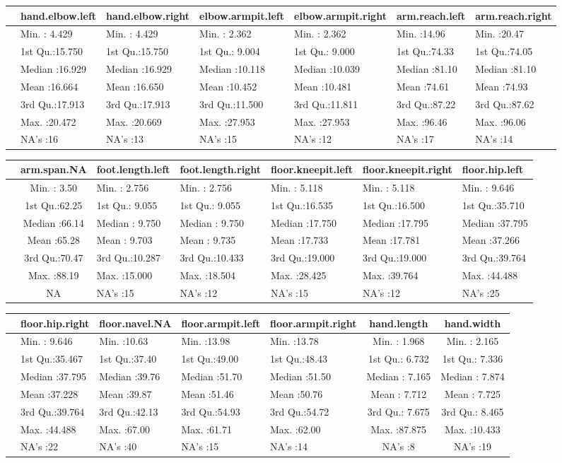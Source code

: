 \documentclass[]{article}
\begin{document}
\begin{longtable}[]{@{}lllllll@{}}
\toprule
& hand.elbow.left & hand.elbow.right & elbow.armpit.left &
elbow.armpit.right & arm.reach.left & arm.reach.right\tabularnewline
\midrule
\endhead
& Min. : 4.429 & Min. : 4.429 & Min. : 2.362 & Min. : 2.362 & Min.
:14.96 & Min. :20.47\tabularnewline
& 1st Qu.:15.750 & 1st Qu.:15.750 & 1st Qu.: 9.004 & 1st Qu.: 9.000 &
1st Qu.:74.33 & 1st Qu.:74.05\tabularnewline
& Median :16.929 & Median :16.929 & Median :10.118 & Median :10.039 &
Median :81.10 & Median :81.10\tabularnewline
& Mean :16.664 & Mean :16.650 & Mean :10.452 & Mean :10.481 & Mean
:74.61 & Mean :74.93\tabularnewline
& 3rd Qu.:17.913 & 3rd Qu.:17.913 & 3rd Qu.:11.500 & 3rd Qu.:11.811 &
3rd Qu.:87.22 & 3rd Qu.:87.62\tabularnewline
& Max. :20.472 & Max. :20.669 & Max. :27.953 & Max. :27.953 & Max.
:96.46 & Max. :96.06\tabularnewline
& NA's :16 & NA's :13 & NA's :15 & NA's :12 & NA's :17 & NA's
:14\tabularnewline
\bottomrule
\end{longtable}

\begin{longtable}[]{@{}lclllll@{}}
\toprule
& arm.span.NA & foot.length.left & foot.length.right &
floor.kneepit.left & floor.kneepit.right & floor.hip.left\tabularnewline
\midrule
\endhead
& Min. : 3.50 & Min. : 2.756 & Min. : 2.756 & Min. : 5.118 & Min. :
5.118 & Min. : 9.646\tabularnewline
& 1st Qu.:62.25 & 1st Qu.: 9.055 & 1st Qu.: 9.055 & 1st Qu.:16.535 & 1st
Qu.:16.500 & 1st Qu.:35.710\tabularnewline
& Median :66.14 & Median : 9.750 & Median : 9.750 & Median :17.750 &
Median :17.795 & Median :37.795\tabularnewline
& Mean :65.28 & Mean : 9.703 & Mean : 9.735 & Mean :17.733 & Mean
:17.781 & Mean :37.266\tabularnewline
& 3rd Qu.:70.47 & 3rd Qu.:10.287 & 3rd Qu.:10.433 & 3rd Qu.:19.000 & 3rd
Qu.:19.000 & 3rd Qu.:39.764\tabularnewline
& Max. :88.19 & Max. :15.000 & Max. :18.504 & Max. :28.425 & Max.
:39.764 & Max. :44.488\tabularnewline
& NA & NA's :15 & NA's :12 & NA's :15 & NA's :12 & NA's
:25\tabularnewline
\bottomrule
\end{longtable}

\begin{longtable}[]{@{}lllllcc@{}}
\toprule
& floor.hip.right & floor.navel.NA & floor.armpit.left &
floor.armpit.right & hand.length & hand.width\tabularnewline
\midrule
\endhead
& Min. : 9.646 & Min. :10.63 & Min. :13.98 & Min. :13.78 & Min. : 1.968
& Min. : 2.165\tabularnewline
& 1st Qu.:35.467 & 1st Qu.:37.40 & 1st Qu.:49.00 & 1st Qu.:48.43 & 1st
Qu.: 6.732 & 1st Qu.: 7.336\tabularnewline
& Median :37.795 & Median :39.76 & Median :51.70 & Median :51.50 &
Median : 7.165 & Median : 7.874\tabularnewline
& Mean :37.228 & Mean :39.87 & Mean :51.46 & Mean :50.76 & Mean : 7.712
& Mean : 7.725\tabularnewline
& 3rd Qu.:39.764 & 3rd Qu.:42.13 & 3rd Qu.:54.93 & 3rd Qu.:54.72 & 3rd
Qu.: 7.675 & 3rd Qu.: 8.465\tabularnewline
& Max. :44.488 & Max. :67.00 & Max. :61.71 & Max. :62.00 & Max. :87.875
& Max. :10.433\tabularnewline
& NA's :22 & NA's :40 & NA's :15 & NA's :14 & NA's :8 & NA's
:19\tabularnewline
\bottomrule
\end{longtable}
\end{document}
